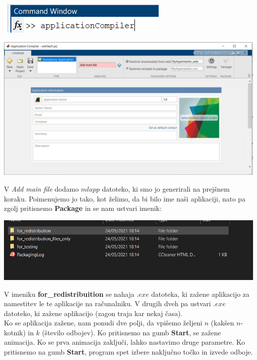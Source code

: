 \documentclass[12pt]{article}
\begin{document}
\centering
\includegraphics{app3.png}
\linebreak

\centering
\includegraphics[scale=0.70]{app4.png}	
\linebreak

\begin{flushleft}
	V \emph{Add main file} dodamo $mlapp$ datoteko, ki smo jo generirali na prejšnem koraku. Poimenujemo jo tako, kot želimo, da bi bilo ime naši aplikaciji, nato pa zgolj pritisnemo \textbf{Package} in se nam ustvari imenik:
\end{flushleft}


\centering
\includegraphics{app5.png}



\begin{flushleft}
	V imeniku \textbf{for\_redistribuition} se nahaja $.exe$ datoteka, ki zažene aplikacijo za namestitev le te aplikacije na računalniku. V drugih dveh pa ustvari $.exe$ datoteko, ki zažene aplikacijo (zagon traja kar nekaj časa).\\
	Ko se aplikacija zažene, nam ponudi dve polji, da vpišemo željeni $n$ (kakšen $n$-kotnik) in $k$ (število odbojev). Ko pritisnemo na gumb \textbf{Start}, se zažene animacija. Ko se prva animacija zaključi, lahko nastavimo druge parametre. Ko pritisnemo na gumb \textbf{Start}, program spet izbere naključno točko in izvede odboje.
\end{flushleft}
\end{document}
